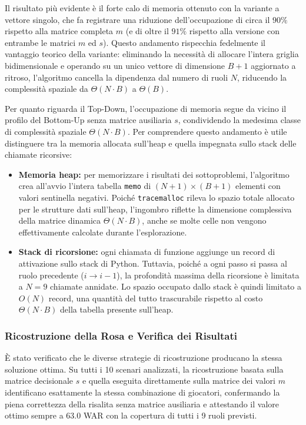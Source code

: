 Il risultato più evidente è il forte calo di memoria ottenuto con la variante a vettore singolo, che fa registrare una riduzione dell'occupazione di circa il $90\%$ rispetto alla matrice completa $m$ (e di oltre il $91\%$ rispetto alla versione con entrambe le matrici $m$ ed $s$). Questo andamento rispecchia fedelmente il vantaggio teorico della variante: eliminando la necessità di allocare l'intera griglia bidimensionale e operando su un unico vettore di dimensione $B + 1$ aggiornato a ritroso, l'algoritmo cancella la dipendenza dal numero di ruoli $N$, riducendo la complessità spaziale da $\Theta(N \cdot B)$ a $\Theta(B)$.

Per quanto riguarda il Top-Down, l'occupazione di memoria segue da vicino il profilo del Bottom-Up senza matrice ausiliaria $s$, condividendo la medesima classe di complessità spaziale $\Theta(N \cdot B)$. Per comprendere questo andamento è utile distinguere tra la memoria allocata sull'heap e quella impegnata sullo stack delle chiamate ricorsive:
\begin{itemize}
	\item \textbf{Memoria heap:} per memorizzare i risultati dei sottoproblemi, l'algoritmo crea all'avvio l'intera tabella \texttt{memo} di $(N+1) \times (B+1)$ elementi con valori sentinella negativi. Poiché \texttt{tracemalloc} rileva lo spazio totale allocato per le strutture dati sull'heap, l'ingombro riflette la dimensione complessiva della matrice dinamica $\Theta(N \cdot B)$, anche se molte celle non vengono effettivamente calcolate durante l'esplorazione.
	\item \textbf{Stack di ricorsione:} ogni chiamata di funzione aggiunge un record di attivazione sullo stack di Python. Tuttavia, poiché a ogni passo si passa al ruolo precedente ($i \to i-1$), la profondità massima della ricorsione è limitata a $N = 9$ chiamate annidate. Lo spazio occupato dallo stack è quindi limitato a $O(N)$ record, una quantità del tutto trascurabile rispetto al costo $\Theta(N \cdot B)$ della tabella presente sull'heap.
\end{itemize}

\subsubsection{Ricostruzione della Rosa e Verifica dei Risultati}
È stato verificato che le diverse strategie di ricostruzione producano la stessa soluzione ottima. Su tutti i 10 scenari analizzati, la ricostruzione basata sulla matrice decisionale $s$ e quella eseguita direttamente sulla matrice dei valori $m$ identificano esattamente la stessa combinazione di giocatori, confermando la piena correttezza della risalita senza matrice ausiliaria e attestando il valore ottimo sempre a $63.0$ WAR con la copertura di tutti i 9 ruoli previsti.

